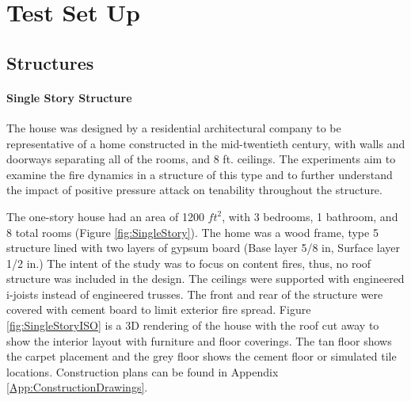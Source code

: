 \documentclass{article}
\begin{document}
\clearpage

\section{Test Set Up}

\subsection{Structures}

\paragraph{Single Story Structure} \mbox{}

The house was designed by a residential architectural company to be representative of a home constructed in the mid-twentieth century, with walls and doorways separating all of the rooms, and 8 ft. ceilings. The experiments aim to examine the fire dynamics in a structure of this type and to further understand the impact of positive pressure attack on tenability throughout the structure.

The one-story house had an area of 1200 $ft^2$, with 3 bedrooms, 1 bathroom, and 8 total rooms (Figure \ref{fig:SingleStory}). The home was a wood frame, type 5 structure lined with two layers of gypsum board (Base layer 5/8 in, Surface layer 1/2 in.) The intent of the study was to focus on content fires, thus, no roof structure was included in the design. The ceilings were supported with engineered i-joists instead of engineered trusses. The front and rear of the structure were covered with cement board to limit exterior fire spread. Figure \ref{fig:SingleStoryISO} is a 3D rendering of the house with the roof cut away to show the interior layout with furniture and floor coverings. The tan floor shows the carpet placement and the grey floor shows the cement floor or simulated tile locations. Construction plans can be found in Appendix \ref{App:ConstructionDrawings}.
\end{document}
